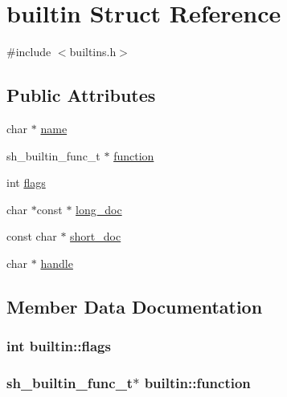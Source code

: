 \hypertarget{structbuiltin}{}\section{builtin Struct Reference}
\label{structbuiltin}


{\ttfamily \#include $<$builtins.\+h$>$}

\subsection*{Public Attributes}
\begin{DoxyCompactItemize}
\item 
char $\ast$ \hyperlink{structbuiltin_a66ae19dbf9a3fec9c0872c66b6bfcba7}{name}
\item 
sh\+\_\+builtin\+\_\+func\+\_\+t $\ast$ \hyperlink{structbuiltin_a221595fc746de4d7d6b4df53bf67d33a}{function}
\item 
int \hyperlink{structbuiltin_a9f583bfe9459f1e181c58a79a0f49a8e}{flags}
\item 
char $\ast$const $\ast$ \hyperlink{structbuiltin_a41b55325fbb47cfc0b9be49cc7510735}{long\+\_\+doc}
\item 
const char $\ast$ \hyperlink{structbuiltin_acd7ac42244b07bafa4fbab01b6318d79}{short\+\_\+doc}
\item 
char $\ast$ \hyperlink{structbuiltin_ac691203d59944ccbe8f0118abdd221e3}{handle}
\end{DoxyCompactItemize}


\subsection{Member Data Documentation}
\subsubsection[{\texorpdfstring{flags}{flags}}]{\setlength{\rightskip}{0pt plus 5cm}int builtin\+::flags}\hypertarget{structbuiltin_a9f583bfe9459f1e181c58a79a0f49a8e}{}\label{structbuiltin_a9f583bfe9459f1e181c58a79a0f49a8e}
\subsubsection[{\texorpdfstring{function}{function}}]{\setlength{\rightskip}{0pt plus 5cm}sh\+\_\+builtin\+\_\+func\+\_\+t$\ast$ builtin\+::function}\hypertarget{structbuiltin_a221595fc746de4d7d6b4df53bf67d33a}{}\label{structbuiltin_a221595fc746de4d7d6b4df53bf67d33a}
